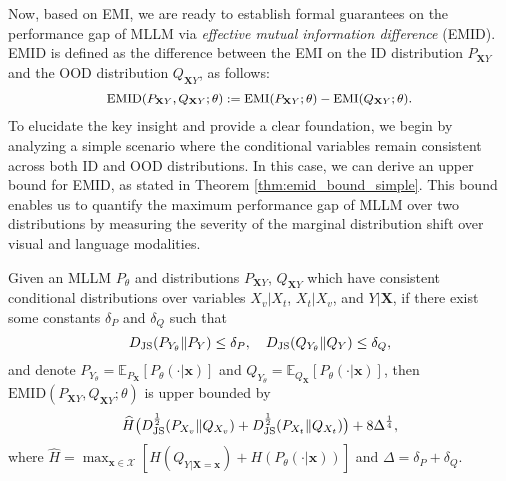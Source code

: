 Now, based on EMI, we are ready to establish formal guarantees on the performance gap of MLLM via \textit{effective mutual information difference} (EMID). EMID is defined as the difference between the EMI on  the ID distribution $P_{\mathbf{X}Y}$ and the OOD distribution $Q_{\mathbf{X}Y}$, as follows:
\begin{equation} \label{eq:emid}
{\small
\begin{split}
    \text{EMID}(P_{\mathbf{X}Y},Q_{\mathbf{X}Y};\theta) :=\text{EMI}(P_{\mathbf{X}Y};\theta) - \text{EMI}(Q_{\mathbf{X}Y};\theta).
    \end{split}
}
\end{equation}
To elucidate the key insight and provide a clear foundation, we begin by analyzing a simple scenario where the conditional variables remain consistent across both ID and OOD distributions.
In this case, we can derive an upper bound for EMID,  as stated in Theorem \ref{thm:emid_bound_simple}. This bound enables us to quantify the maximum performance gap of MLLM over two distributions by measuring the severity of the marginal distribution shift over visual and language modalities. 

\vspace{0.2cm}
\begin{theorem}\label{thm:emid_bound_simple}
 Given an MLLM $P_{\theta}$ and distributions $P_{\mathbf{X}Y}$, $Q_{\mathbf{X}Y}$ which have consistent conditional distributions over variables $X_{v}|X_{t}$, $X_{t}|X_{v}$, and $Y|\mathbf{X}$,
if there exist some constants $\delta_{P}$ and $\delta_{Q}$ such that
\begin{equation*}
    D_{\rm JS}(P_{Y_{{\theta}}}\|P_{Y})\leq \delta_{P},~~~ D_{\rm JS}(Q_{Y_{{\theta}}}\|Q_{Y})\leq \delta_{Q},
\end{equation*}
 and denote $P_{Y_{\theta}}=\mathbb{E}_{P_{\mathbf{X}}} [P_{{\theta}}(\cdot|\mathbf{x})]$ and $Q_{Y_{\theta}}=\mathbb{E}_{Q_{\mathbf{X}}} [P_{{\theta}}(\cdot|\mathbf{x})]$, then $\text{EMID}(P_{\mathbf{X}Y},Q_{\mathbf{X}Y};\theta)$ is upper bounded by
\begin{equation} \label{eq:emid_bound_simple}
    \begin{split}
     \widehat{H}\big( { D^{\frac{1}{2}}_{\rm JS}(P_{X_{v}}\|Q_{X_{v}})} + {D^{\frac{1}{2}}_{\rm JS}(P_{X_{t}}\|Q_{X_{t}})} \big) + 8\Delta^{\frac{1}{4}},
    \end{split}
\end{equation}
\normalsize
where $ \widehat{H}=\max_{\mathbf{x}\in\mathcal{X}} [H(Q_{Y|\mathbf{X}=\mathbf{x}})+H(P_{\theta}(\cdot|\mathbf{x}))]$ and $\Delta=\delta_{P}+\delta_{Q}$. 
\end{theorem}


